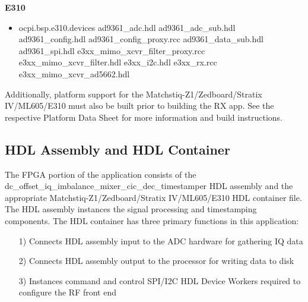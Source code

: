 	\begin{minipage}[t]{.33\textwidth}
	\textbf{E310}
	\begin{itemize}
		\item ocpi.bsp.e310.devices
			\subitem ad9361\_adc.hdl
			\subitem ad9361\_adc\_sub.hdl
			\subitem ad9361\_config.hdl
			\subitem ad9361\_config\_proxy.rcc
			\subitem ad9361\_data\_sub.hdl
			\subitem ad9361\_spi.hdl
			\subitem e3xx\_mimo\_xcvr\_filter\_proxy.rcc
			\subitem e3xx\_mimo\_xcvr\_filter.hdl
			\subitem e3xx\_i2c.hdl
			\subitem e3xx\_rx.rcc
			\subitem e3xx\_mimo\_xcvr\_ad5662.hdl
	\end{itemize}
	\end{minipage} \medskip



\noindent Additionally, platform support for the Matchstiq-Z1/Zedboard/Stratix IV/ML605/E310 must also be built prior to building the RX app. See the respective Platform Data Sheet for more information and build instructions.
\newpage

\subsection{HDL Assembly and HDL Container}
The FPGA portion of the application consists of the dc\_offset\_iq\_imbalance\_mixer\_cic\_dec\_timestamper HDL assembly and the appropriate  Matchstiq-Z1/Zedboard/Stratix IV/ML605/E310 HDL container file. The HDL assembly instances the signal processing and timestamping components. The HDL container has three primary functions in this application:
\begin{itemize}
	\item[1)] Connects HDL assembly input to the ADC hardware for gathering IQ data
	\item[2)] Connects HDL assembly output to the processor for writing data to disk
	\item[3)] Instances command and control SPI/I2C HDL Device Workers required to configure the RF front end
\end{itemize}
